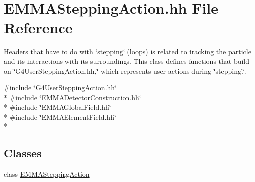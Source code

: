 \hypertarget{EMMASteppingAction_8hh}{\section{E\-M\-M\-A\-Stepping\-Action.\-hh File Reference}
\label{EMMASteppingAction_8hh}
}


Headers that have to do with \char`\"{}stepping\char`\"{} (loops) is related to tracking the particle and its interactions with its surroundings. This class defines functions that build on \char`\"{}\-G4\-User\-Stepping\-Action.\-hh,\char`\"{} which represents user actions during \char`\"{}stepping.\char`\"{}.  


{\ttfamily \#include \char`\"{}G4\-User\-Stepping\-Action.\-hh\char`\"{}}\\*
{\ttfamily \#include \char`\"{}E\-M\-M\-A\-Detector\-Construction.\-hh\char`\"{}}\\*
{\ttfamily \#include \char`\"{}E\-M\-M\-A\-Global\-Field.\-hh\char`\"{}}\\*
{\ttfamily \#include \char`\"{}E\-M\-M\-A\-Element\-Field.\-hh\char`\"{}}\\*
\subsection*{Classes}
\begin{DoxyCompactItemize}
\item 
class \hyperlink{classEMMASteppingAction}{E\-M\-M\-A\-Stepping\-Action}
\end{DoxyCompactItemize}

